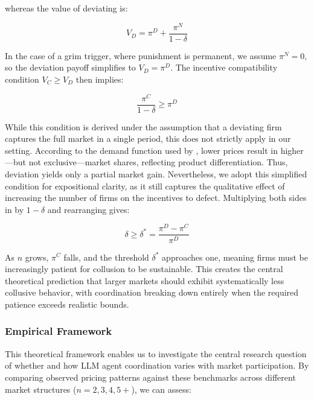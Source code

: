 whereas the value of deviating is:

\begin{equation}
    V_D = \pi^D + \frac{\pi^N}{1 - \delta}
\end{equation}

In the case of a grim trigger, where punishment is permanent, we assume $\pi^N = 0$, so the deviation payoff simplifies to $V_D = \pi^D$. The incentive compatibility condition $V_C \geq V_D$ then implies:

\begin{equation}\label{eq:inc}
    \frac{\pi^C}{1 - \delta} \geq \pi^D
\end{equation}

While this condition is derived under the assumption that a deviating firm captures the full market in a single period, this does not strictly apply in our setting. According to the demand function used by \textcite{calvano_artificial_2020}, lower prices result in higher---but not exclusive---market shares, reflecting product differentiation. Thus, deviation yields only a partial market gain. Nevertheless, we adopt this simplified condition for expositional clarity, as it still captures the qualitative effect of increasing the number of firms on the incentives to defect. Multiplying both sides in  by $1 - \delta$ and rearranging gives:

\begin{equation}
    \delta \geq \delta^* = \frac{\pi^D - \pi^C}{\pi^D}
\end{equation}

As $n$ grows, $\pi^C$ falls, and the threshold $\delta^*$ approaches one, meaning firms must be increasingly patient for collusion to be sustainable. This creates the central theoretical prediction that larger markets should exhibit systematically less collusive behavior, with coordination breaking down entirely when the required patience exceeds realistic bounds.

\subsubsection*{Empirical Framework}

This theoretical framework enables us to investigate the central research question of whether and how LLM agent coordination varies with market participation. By comparing observed pricing patterns against these benchmarks across different market structures ($n = 2, 3, 4, 5+$), we can assess:

